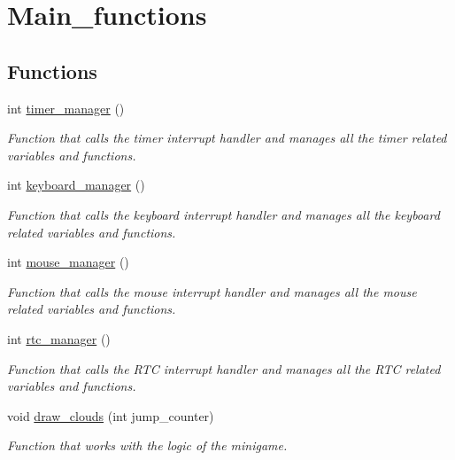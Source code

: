 \hypertarget{group__main__functions}{}\section{Main\+\_\+functions}
\label{group__main__functions}
\subsection*{Functions}
\begin{DoxyCompactItemize}
\item 
int \hyperlink{group__main__functions_ga230337632aac7d793969e926a66f0249}{timer\+\_\+manager} ()
\begin{DoxyCompactList}\small\item\em Function that calls the timer interrupt handler and manages all the timer related variables and functions. \end{DoxyCompactList}\item 
int \hyperlink{group__main__functions_gaaf064e0d3192ae8797d78dcb08bc838e}{keyboard\+\_\+manager} ()
\begin{DoxyCompactList}\small\item\em Function that calls the keyboard interrupt handler and manages all the keyboard related variables and functions. \end{DoxyCompactList}\item 
int \hyperlink{group__main__functions_ga8c9f11a032076f800d5d8e3faea17c9a}{mouse\+\_\+manager} ()
\begin{DoxyCompactList}\small\item\em Function that calls the mouse interrupt handler and manages all the mouse related variables and functions. \end{DoxyCompactList}\item 
int \hyperlink{group__main__functions_gac1cad6d7c8507831aa74d165972cb1a9}{rtc\+\_\+manager} ()
\begin{DoxyCompactList}\small\item\em Function that calls the R\+TC interrupt handler and manages all the R\+TC related variables and functions. \end{DoxyCompactList}\item 
void \hyperlink{group__main__functions_ga527ecae69a4a84b54c2c1e0fdfb4b72d}{draw\+\_\+clouds} (int jump\+\_\+counter)
\begin{DoxyCompactList}\small\item\em Function that works with the logic of the minigame. \end{DoxyCompactList}\end{DoxyCompactItemize}


